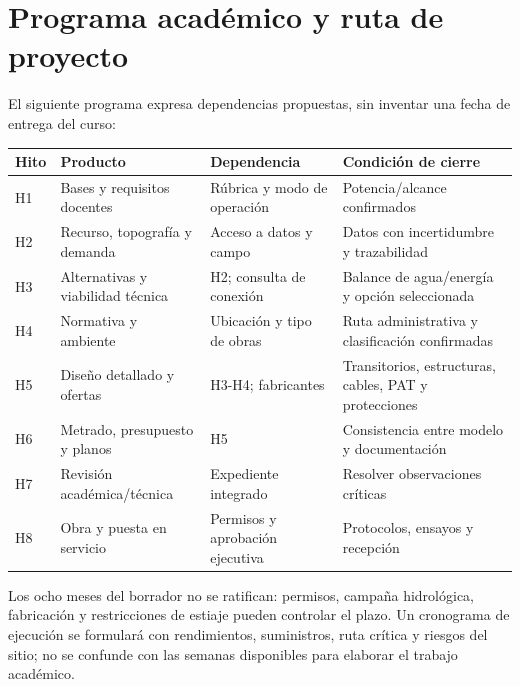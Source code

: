 \section{Programa académico y ruta de proyecto}
El siguiente programa expresa dependencias propuestas, sin inventar una fecha de entrega del curso:
\begin{longtable}{L{1cm}L{4.1cm}L{4.4cm}L{4.9cm}}
\toprule Hito & Producto & Dependencia & Condición de cierre\\\midrule
H1 & Bases y requisitos docentes & Rúbrica y modo de operación & Potencia/alcance confirmados\\
H2 & Recurso, topografía y demanda & Acceso a datos y campo & Datos con incertidumbre y trazabilidad\\
H3 & Alternativas y viabilidad técnica & H2; consulta de conexión & Balance de agua/energía y opción seleccionada\\
H4 & Normativa y ambiente & Ubicación y tipo de obras & Ruta administrativa y clasificación confirmadas\\
H5 & Diseño detallado y ofertas & H3-H4; fabricantes & Transitorios, estructuras, cables, PAT y protecciones\\
H6 & Metrado, presupuesto y planos & H5 & Consistencia entre modelo y documentación\\
H7 & Revisión académica/técnica & Expediente integrado & Resolver observaciones críticas\\
H8 & Obra y puesta en servicio & Permisos y aprobación ejecutiva & Protocolos, ensayos y recepción\\
\bottomrule
\end{longtable}
Los ocho meses del borrador no se ratifican: permisos, campaña hidrológica, fabricación y restricciones de estiaje pueden controlar el plazo. Un cronograma de ejecución se formulará con rendimientos, suministros, ruta crítica y riesgos del sitio; no se confunde con las semanas disponibles para elaborar el trabajo académico.
